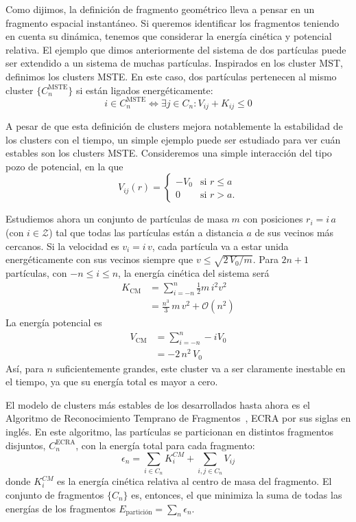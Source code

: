 Como dijimos, la definición de fragmento geométrico lleva a pensar en un fragmento espacial instantáneo.
Si queremos identificar los fragmentos teniendo en cuenta su dinámica, tenemos que considerar la energía cinética y potencial relativa.
El ejemplo que dimos anteriormente del sistema de dos partículas puede ser extendido a un sistema de muchas partículas.
Inspirados en los cluster MST, definimos los clusters MSTE.
En este caso, dos partículas pertenecen al mismo cluster $\{C^{\text{MSTE}}_n\}$ si están ligados energéticamente:
\begin{equation*}
  i \in C^{\text{MSTE}}_n \Leftrightarrow \exists j \in C_n : V_{ij}+ K_{ij} \le 0
\end{equation*}

A pesar de que esta definición de clusters mejora notablemente la estabilidad de los clusters con el tiempo, un simple ejemplo puede ser estudiado para ver cuán estables son los clusters MSTE.
Consideremos una simple interacción del tipo pozo de potencial, en la que
\begin{equation}
V_{ij}(r) =
\begin{cases}
-V_0 &\text{si } r \leq a\\
0 &\text{si } r > a.
\end{cases}
\end{equation}

Estudiemos ahora un conjunto de partículas de masa $m$ con posiciones $r_i = i\,a$ (con $i \in \mathcal{Z}$) tal que todas las partículas están a distancia $a$ de sus vecinos más cercanos.
Si la velocidad es $v_i = i\,v$, cada partícula va a estar unida energéticamente con sus vecinos siempre que $v \leq \sqrt{2\,V_0/m}$.
Para $2n+1$ partículas, con $-n \leq i \leq n$, la energía cinética del sistema será
\begin{align}
  K_{\text{CM}} &= \sum_{i=-n}^n \frac{1}{2} m\, i^2 v^2\\
  &= \frac{n^3}{3}\,m\,v^2 + \mathcal{O}(n^2)
\end{align}
La energía potencial es
\begin{align}
  V_{\text{CM}} &= \sum_{i=-n}^n -i V_0\\
  &= - 2\,n^2\,V_0
\end{align}
Así, para $n$ suficientemente grandes, este cluster va a ser claramente inestable en el tiempo, ya que su energía total es mayor a cero.

El modelo de clusters más estables de los desarrollados hasta ahora es el Algoritmo de Reconocimiento Temprano de Fragmentos~\cite{dorso_early_1993}, ECRA por sus siglas en inglés.
En este algoritmo, las partículas se particionan en distintos fragmentos disjuntos, $C^{\text{ECRA}}_n$, con la energía total para cada fragmento:
\begin{equation*}
  \epsilon_n = \sum_{i \in C_n} K^{CM}_i +  \sum_{i,j \in C_n} V_{ij}
\end{equation*}
donde $K^{CM}_i$ es la energía cinética relativa al centro de masa del fragmento.
El conjunto de fragmentos $\{C_n\}$ es, entonces, el que minimiza la suma de todas las energías de los fragmentos $E_{\text{partición}} = \sum_n \epsilon_n$.

